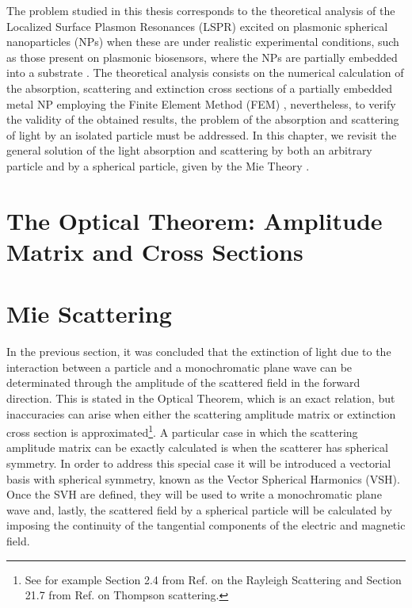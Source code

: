 \documentclass[11pt]{Latex/Classes/PhDthesisPSnPDF}
\begin{document}
The problem studied in this thesis corresponds to the theoretical analysis of the Localized Surface Plasmon Resonances (LSPR)  excited on plasmonic spherical nanoparticles (NPs) when these are under realistic experimental conditions, such as those present on plasmonic biosensors, where the NPs are partially embedded into a substrate \cite{moirangthem_enhanced_2012}. The theoretical analysis consists on the numerical calculation of the absorption, scattering and extinction  cross sections of a partially embedded metal NP employing the Finite Element Method (FEM) , nevertheless, to verify the validity of the obtained results, the problem of the absorption and scattering of light by an isolated particle must be addressed. In this chapter, we revisit the general solution of the light absorption and scattering by both an arbitrary particle and by a spherical particle, given by the Mie Theory \cite{bohren_absorption_1983}.

	\section{The Optical Theorem: Amplitude Matrix and Cross Sections}
	\label{section:AmpMatCrossSect}
	

	\section{Mie Scattering}
	\label{section:Mie}

In the previous section, it was concluded that the extinction of light due to the interaction between a particle and a monochromatic plane wave can be determinated through the amplitude of the scattered field in the forward direction. This is stated in the Optical Theorem, which is an exact relation, but inaccuracies can arise when either the scattering amplitude matrix or extinction cross section is approximated\footnote{See for example Section 2.4 from Ref. \cite{tsang_scattering_2000} on the Rayleigh Scattering and Section 21.7 from Ref. \cite{zangwill_modern_2013} on Thompson scattering.}. A particular case in which the scattering amplitude matrix can be exactly calculated is when the scatterer has spherical symmetry. In order to address this special case it will be introduced a vectorial basis with spherical symmetry, known as the Vector Spherical Harmonics (VSH). Once the SVH are defined, they will be used to write a monochromatic plane wave and, lastly, the scattered field by a spherical particle will be calculated by imposing the continuity of the tangential components of the electric and magnetic field.
\end{document}

